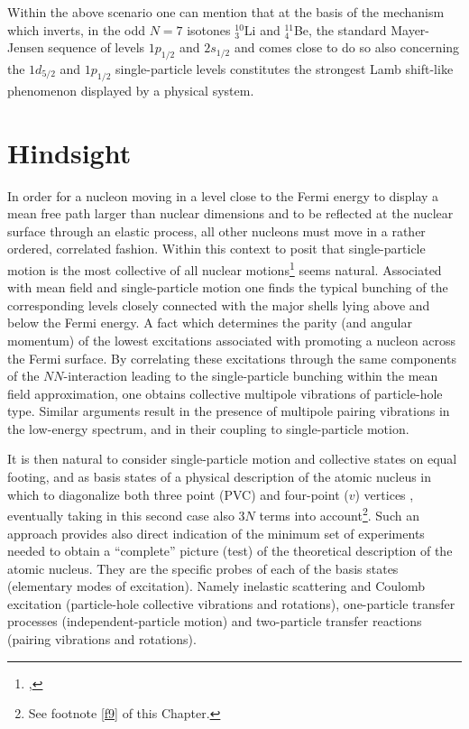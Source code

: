 Within the above scenario one can mention that at the basis of the mechanism which inverts, in the odd $N=7$ isotones $^{10}_3$Li and $^{11}_4$Be, the standard Mayer-Jensen sequence of levels $1p_{1/2}$ and $2s_{1/2}$ and comes close to do so also concerning the $1d_{5/2}$ and $1p_{1/2}$ single-particle levels constitutes the strongest Lamb shift-like phenomenon displayed by a physical system.
\section{Hindsight}\label{Sect1.10}
In order for a nucleon moving in a level close to the Fermi energy to display a mean free path larger than nuclear dimensions and to be reflected at the nuclear surface through an elastic process, all other nucleons must move in a rather ordered, correlated fashion. Within this context to posit that single-particle motion is the most collective of all nuclear motions\footnote{\cite{Mottelson:62},} seems natural. Associated with mean field and single-particle motion one finds the typical bunching of the corresponding levels closely connected with the major shells lying above and below the Fermi energy. A fact which determines the parity (and angular momentum) of the lowest excitations associated with promoting  a nucleon across the Fermi surface.  By correlating these excitations through the same components of the $NN$-interaction leading to the single-particle bunching within the mean field approximation, one obtains  collective multipole  vibrations of particle-hole type. Similar arguments result in the presence of multipole pairing vibrations in the low-energy spectrum, and in their coupling to single-particle motion.

It is then natural to consider single-particle motion  and collective states on equal footing, and as basis states of a physical description of the atomic nucleus in which to diagonalize both three point  (PVC) and four-point ($v$) vertices , eventually taking in this second case also 3$N$ terms into account\footnote{See footnote \ref{f9} of this Chapter.}. Such an approach  provides also direct indication of the minimum set of experiments needed to obtain a ``complete'' picture (test)  of the theoretical description of the atomic nucleus. They are the specific probes of each of the basis states (elementary modes of excitation). Namely inelastic scattering and Coulomb excitation (particle-hole collective vibrations and rotations), one-particle transfer processes (independent-particle motion) and two-particle transfer reactions (pairing vibrations and rotations). 


